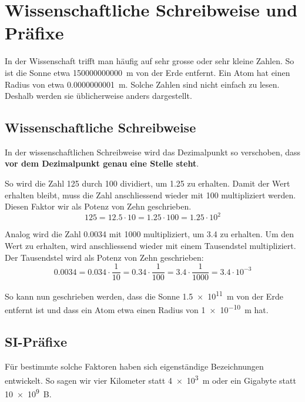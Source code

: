\newpage
\section{Wissenschaftliche Schreibweise und Präfixe}

In der Wissenschaft trifft man häufig auf sehr grosse oder sehr kleine Zahlen. So ist die Sonne etwa \qty{150000000000}{m} von der Erde entfernt. Ein Atom hat einen Radius von etwa \qty{0.0000000001}{m}. Solche Zahlen sind nicht einfach zu lesen. Deshalb werden sie üblicherweise anders dargestellt.

\subsection{Wissenschaftliche Schreibweise}

In der wissenschaftlichen Schreibweise wird das Dezimalpunkt so verschoben, dass \textbf{vor dem Dezimalpunkt genau eine Stelle steht}.

So wird die Zahl 125 durch 100 dividiert, um 1.25 zu erhalten. Damit der Wert erhalten bleibt, muss die Zahl anschliessend wieder mit 100 multipliziert werden. Diesen Faktor wir als Potenz von Zehn geschrieben.
\[
  125 = 12.5\cdot 10 = 1.25 \cdot 100 = 1.25 \cdot 10^{2}
\]

Analog wird die Zahl 0.0034 mit 1000 multipliziert, um 3.4 zu erhalten. Um den Wert zu erhalten, wird anschliessend wieder mit einem Tausendstel multipliziert. Der Tausendstel wird als Potenz von Zehn geschrieben:
\[
  0.0034 = 0.034\cdot \frac{1}{10} = 0.34 \cdot\frac{1}{100} = 3.4\cdot\frac{1}{1000} = 3.4\cdot 10^{-3}
\]

\begin{example}
  So kann nun geschrieben werden, dass die Sonne \qty{1.5e11}{m} von der Erde entfernt ist und dass ein Atom etwa einen Radius von \qty{1e-10}{m} hat.
\end{example}

\newpage
\subsection{SI-Präfixe}

Für bestimmte solche Faktoren haben sich eigenständige Bezeichnungen entwickelt. So sagen wir vier Kilometer statt \qty{4e3}{m} oder ein Gigabyte statt \qty{10e9}{B}.

